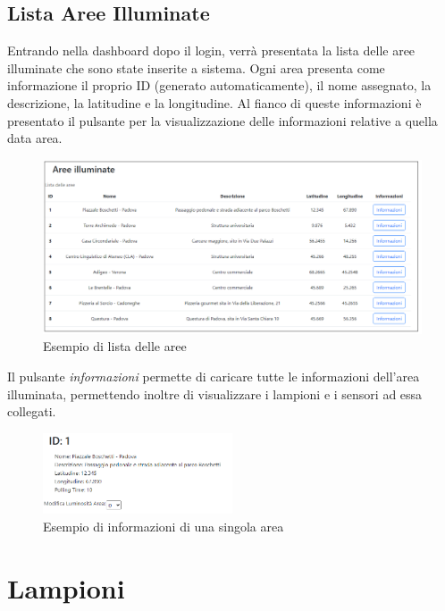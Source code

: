 \documentclass[a4paper, 12pt]{article}
\begin{document}
\subsection{Lista Aree Illuminate}
Entrando nella dashboard dopo il login, verrà presentata la lista delle aree illuminate che sono state inserite a sistema. Ogni area presenta come informazione il proprio ID (generato automaticamente), il nome assegnato, la descrizione, la latitudine e la longitudine. Al fianco di queste informazioni è presentato il pulsante per la visualizzazione delle informazioni relative a quella data area.\\
\begin{figure}[H]
    \centering
    \includegraphics[width=\textwidth]{ListaAree}
    \caption{Esempio di lista delle aree}
\end{figure}
Il pulsante \textit{informazioni} permette di caricare tutte le informazioni dell'area illuminata, permettendo inoltre di visualizzare i lampioni e i sensori ad essa collegati.\\
\begin{figure}[H]
    \centering
    \includegraphics[width=0.5\textwidth]{InfoArea}
    \caption{Esempio di informazioni di una singola area}
\end{figure}

\newpage
\section{Lampioni}
\end{document}
